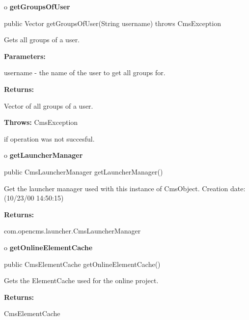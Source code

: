 o {\bf getGroupsOfUser}

\begin{PRE}
 public Vector getGroupsOfUser(String username) throws CmsException
\end{PRE}

\begin{description}
\htmlDD Gets all groups of a user.

\begin{description}
\item {\bf Parameters:}

username - the name of the user to get all groups for.
\item {\bf Returns:}

Vector of all groups of a user.
\item {\bf Throws:} CmsException

if operation was not succesful.
\end{description}

\end{description}

o {\bf getLauncherManager}

\begin{PRE}
 public CmsLauncherManager getLauncherManager()
\end{PRE}

\begin{description}
\htmlDD Get the launcher manager used with this instance of CmsObject.
Creation date: (10/23/00 14:50:15)

\begin{description}
\item {\bf Returns:}

com.opencms.launcher.CmsLauncherManager
\end{description}

\end{description}

o {\bf getOnlineElementCache}

\begin{PRE}
 public CmsElementCache getOnlineElementCache()
\end{PRE}

\begin{description}
\htmlDD Gets the ElementCache used for the online project.

\begin{description}
\item {\bf Returns:}

CmsElementCache
\end{description}

\end{description}

